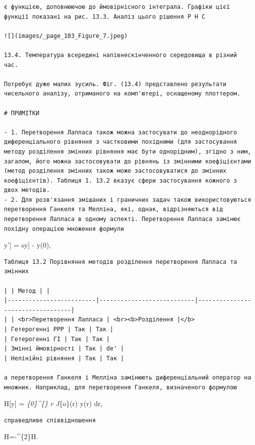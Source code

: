 \documentclass[
  ukrainian,
]{article}
\begin{document}
\begin{verbatim}
є функцією, доповнюючою до ймовірнісного інтеграла. Графіки цієї функції показані на рис. 13.3. Аналіз цього рішення P H C

![](images/_page_103_Figure_7.jpeg)

13.4. Температура всередині напівнескінченного середовища в різний час.

Потребує дуже малих зусиль. Фіг. (13.4) представлено результати чисельного аналізу, отриманого на комп'ютері, оснащеному плоттером.

# ПРИМІТКИ

- 1. Перетворення Лапласа також можна застосувати до неоднорідного диференціального рівняння з частковими похідними (для застосування методу розділення змінних рівняння має бути однорідним), згідно з ним, загалом, його можна застосовувати до рівнянь із змінними коефіцієнтами (метод розділення змінних також може застосовуватися до змінних коефіцієнтів). Таблиця 1. 13.2 вказує сфери застосування кожного з двох методів.
- 2. Для розв'язання змішаних і граничних задач також використовуються перетворення Ганкеля та Мелліна, які, однак, відрізняються від перетворення Лапласа в одному аспекті. Перетворення Лапласа замінює похідну операцією множення формули
\end{verbatim}

\mathscr{L}{[}y'{]} = s\mathscr{L}{[}y{]} - y(0),

\begin{verbatim}
Таблиця 13.2 Порівняння методів розділення перетворення Лапласа та змінних

| | Метод | |
|-------------------------|---------------------------|----------------------------------|
| | <br>Перетворення Лапласа | <br><b>Розділення |</b>
| Гетерогенні PPP | Так | Так |
| Гетерогенні ГІ | Так | Так |
| Змінні ймовірності | Так | de' |
| Нелінійні рівняння | Так | Так |

а перетворення Ганкеля і Мелліна замінюють диференціальний оператор на множник. Наприклад, для перетворення Ганкеля, визначеного формулою
\end{verbatim}

H{[}y{]} = \int\emph{\{0\}\^{}\{\infty\} r J}\{o\}(\xi r) y(r) dr,

\begin{verbatim}
справедливе співвідношення
\end{verbatim}

H=-\xi\^{}\{2\}H\left[y\right].
\end{document}
